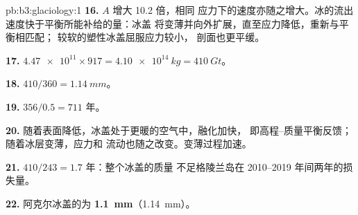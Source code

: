 \begin{solution}{pb:b3:glaciology:1}
\textbf{16.} $A$ 增大 \num{10.2} 倍，相同
应力下的速度亦随之增大。冰的流出速度快于平衡所能补给的量：冰盖
将变薄并向外扩展，直至应力降低，重新与平衡相匹配；
较软的塑性冰盖屈服应力较小，
剖面也更平缓。

\textbf{17.} $\num{4.47e11}\times917 = \qty{4.10e14}{kg} = \qty{410}{Gt}$。

\textbf{18.} $410/360 = \qty{1.14}{mm}$。

\textbf{19.} $356/0.5 = 711$ 年。

\textbf{20.} 随着表面降低，冰盖处于更暖的空气中，融化加快，
即高程–质量平衡反馈；随着冰层变薄，应力和
流动也随之改变。变薄过程加速。

\textbf{21.} $410/243 = \num{1.7}\text{ 年}$：整个冰盖的质量
不足格陵兰岛在 2010--2019 年间两年的损失量。

\textbf{22.} 阿克尔冰盖的为
\textbf{\qty[text-series-to-math=true]{1.1}{mm}}（\qty{1.14}{mm}）。
\end{solution}
